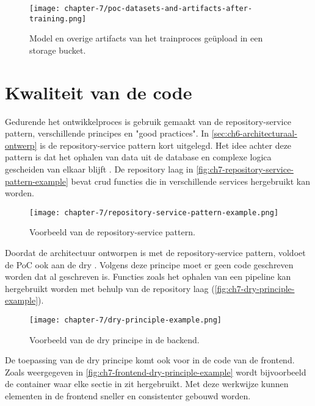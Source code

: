 \begin{figure}[hbt!]
  \centering
  \texttt{[image: chapter-7/poc-datasets-and-artifacts-after-training.png]}
  \caption{Model en overige \glspl{artifact} van het trainproces geüpload in een storage bucket.}
  \label{fig:ch7-poc-datasets-and-artifacts-after-training}
\end{figure}

\section{Kwaliteit van de code}\label{sec:ch7-kwaliteit-van-de-code}
Gedurende het ontwikkelproces is gebruik gemaakt van de repository-service pattern, verschillende principes en "good practices". In \autoref{sec:ch6-architecturaal-ontwerp} is de repository-service pattern kort uitgelegd. Het idee achter deze pattern is dat het ophalen van data uit de database en complexe logica gescheiden van elkaar blijft \cite{repository-service-pattern}. De repository laag in \autoref{fig:ch7-repository-service-pattern-example} bevat \acrfull{crud} functies die in verschillende services hergebruikt kan worden. 

\begin{figure}[hbt!]
  \centering
  \texttt{[image: chapter-7/repository-service-pattern-example.png]}
  \caption{Voorbeeld van de repository-service pattern.}
  \label{fig:ch7-repository-service-pattern-example}
\end{figure}

Doordat de architectuur ontworpen is met de repository-service pattern, voldoet de PoC ook aan de \acrfull{dry} \cite{clean-code-martin}. Volgens deze principe moet er geen code geschreven worden dat al geschreven is. Functies zoals het ophalen van een pipeline kan hergebruikt worden met behulp van de repository laag (\autoref{fig:ch7-dry-principle-example}).

\newpage

\begin{figure}[hbt!]
  \centering
  \texttt{[image: chapter-7/dry-principle-example.png]}
  \caption{Voorbeeld van de \acrfull{dry} principe in de backend.}
  \label{fig:ch7-dry-principle-example}
\end{figure}

De toepassing van de \acrshort{dry} principe komt ook voor in de code van de frontend. Zoals weergegeven in \autoref{fig:ch7-frontend-dry-principle-example} wordt bijvoorbeeld de container waar elke sectie in zit hergebruikt. Met deze werkwijze kunnen elementen in de frontend sneller en consistenter gebouwd worden.

